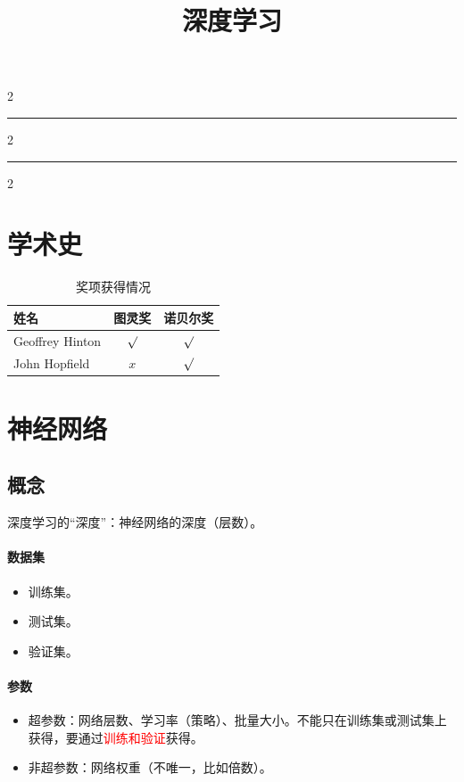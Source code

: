 \documentclass[
12pt, %
a4paper, 
oneside, %
]{scrartcl}
\title{深度学习}
\date{}
\begin{document}
\maketitle
\newpage
\hypertarget{toc}{}
\begingroup
\begin{multicols}{2}
\tableofcontents
\end{multicols}
\endgroup
\hrule
\begingroup
\begin{multicols}{2}
\listoffigures
\end{multicols}
\endgroup
\hrule
\begingroup
\begin{multicols}{2}
\listoftables
\end{multicols}
\endgroup
\newpage
\listoftips
\newpage
\section{学术史}
\begin{table}[H]
\centering
\begin{tabular}{|l|c|c|}
\hline
姓名 & 图灵奖 & 诺贝尔奖 \\
\hline
Geoffrey Hinton & $ \surd $ & $ \surd $ \\
\hline
John Hopfield & $ x $ & $ \surd $ \\
\hline
\end{tabular}
\caption{奖项获得情况}
\end{table}
\section{神经网络}
\subsection[概念]{概念}
深度学习的“深度”：神经网络的深度（层数）。
\paragraph{数据集}
\begin{itemize}
\item 训练集。
\item 测试集。
\item 验证集。
\end{itemize}
\paragraph{参数}
\begin{itemize}
\item 超参数：网络层数、学习率（策略）、批量大小。不能只在训练集或测试集上获得，要通过\textcolor{red}{训练和验证}获得。
\item 非超参数：网络权重（不唯一，比如倍数）。
\end{itemize}
\end{document}
